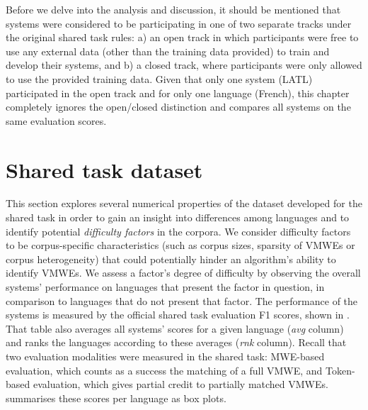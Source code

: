 \documentclass[output=paper
,modfonts
,nonflat,draftmode]{langsci/langscibook}
\begin{document}

Before we delve into the analysis and discussion, it should be mentioned that systems were considered to be participating in one of two separate tracks under the original shared task rules: a) an open track in which participants were free to use any external data (other than the training data provided) to train and develop their systems, and b) a closed track, where participants were only allowed to use the provided training data. Given that only one system (LATL) participated in the open track and for only one language (French), this chapter completely ignores the open/closed distinction and compares all systems on the same evaluation scores.

\section{\label{sec:dataset}Shared task dataset}

This section explores several numerical properties of the dataset developed for the shared task in order to gain an insight into differences among languages and to identify potential \emph{difficulty factors} in the corpora. We consider difficulty factors to be corpus-specific characteristics (such as corpus sizes, sparsity of VMWEs or corpus heterogeneity) that could potentially hinder an algorithm's ability to identify VMWEs. We assess a factor's degree of difficulty by observing the overall systems' performance on languages that present the factor in question, in comparison to languages that do not present that factor. The performance of the systems is measured by the official shared task evaluation F1 scores, shown in . That table also averages all systems' scores for a given language (\emph{avg} column) and ranks the languages according to these averages (\emph{rnk} column). Recall that two evaluation modalities were measured in the shared task: MWE-based evaluation, which counts as a success the matching of a full VMWE, and Token-based evaluation, which gives partial credit to partially matched VMWEs.  summarises these scores per language as box plots. 
\end{document}
